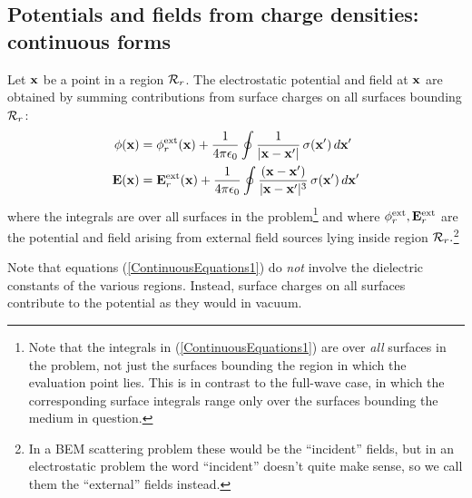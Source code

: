 \documentclass[letterpaper]{article}
\begin{document}
\subsection*{Potentials and fields from charge densities: 
             continuous forms} 

Let $\mathbf{x}$ be a point in a region $\mathcal{R}_r$. The electrostatic potential 
and field at $\mathbf{x}$ are obtained by summing contributions from
surface charges on all surfaces bounding $\mathcal{R}_r$: 
\begin{subequations}
\begin{align}
\phi(\mathbf{x}) 
&= \phi_r^{\hbox{\scriptsize{ext}}}(\mathbf{x}) 
  +\frac{1}{4\pi\epsilon_0} 
   \oint
   \frac{1}{|\mathbf{x} - \mathbf{x}^\prime|}
           \,\sigma(\mathbf{x}^\prime) \, d\mathbf{x}^\prime
\\
\mathbf{E}(\mathbf{x}) 
&= \mathbf{E}_r^{\hbox{\scriptsize{ext}}}(\mathbf{x})
  +\frac{1}{4\pi\epsilon_0}
   \oint
   \frac{(\mathbf{x}-\mathbf{x}^\prime)}
        {|\mathbf{x} - \mathbf{x}^\prime|^3}
        \,\sigma(\mathbf{x}^\prime)\,d\mathbf{x}^\prime
\end{align}
\label{ContinuousEquations1}
\end{subequations}
where the integrals are over all surfaces in the problem\footnote{Note
that the integrals in (\ref{ContinuousEquations1}) are over 
\textit{all} surfaces in the problem, not just the surfaces bounding 
the region in which the evaluation point lies. This is in contrast
to the full-wave case, in which the corresponding surface integrals
range only over the surfaces bounding the medium in question.}
and where $\phi_r^{\hbox{\scriptsize{ext}}},\mathbf{E}_r^{\hbox{\scriptsize{ext}}}$ are the potential
and field arising from external field sources lying inside
region $\mathcal{R}_r.$\footnote{In a BEM scattering problem these 
would be the ``incident'' fields, but in an electrostatic problem 
the word ``incident'' doesn't quite make sense, so we call them 
the ``external'' fields instead.} 

Note that equations (\ref{ContinuousEquations1}) do \textit{not}
involve the dielectric constants of the various regions. Instead,
surface charges on all surfaces contribute to the potential as
they would in vacuum.
\end{document}
